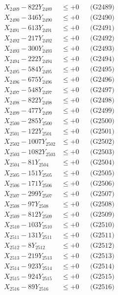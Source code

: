 \documentclass[a4paper,10pt]{article}
\begin{document}
{\begin{align}
X_{2489} - 822Y_{2489} &\leq +0 && \text{(G2489)} \\
X_{2490} - 346Y_{2490} &\leq +0 && \text{(G2490)} \\
\allowbreak
X_{2491} - 613Y_{2491} &\leq +0 && \text{(G2491)} \\
X_{2492} - 217Y_{2492} &\leq +0 && \text{(G2492)} \\
X_{2493} - 300Y_{2493} &\leq +0 && \text{(G2493)} \\
X_{2494} - 222Y_{2494} &\leq +0 && \text{(G2494)} \\
X_{2495} - 584Y_{2495} &\leq +0 && \text{(G2495)} \\
X_{2496} - 675Y_{2496} &\leq +0 && \text{(G2496)} \\
X_{2497} - 548Y_{2497} &\leq +0 && \text{(G2497)} \\
X_{2498} - 822Y_{2498} &\leq +0 && \text{(G2498)} \\
X_{2499} - 477Y_{2499} &\leq +0 && \text{(G2499)} \\
X_{2500} - 285Y_{2500} &\leq +0 && \text{(G2500)} \\
\allowbreak
X_{2501} - 122Y_{2501} &\leq +0 && \text{(G2501)} \\
X_{2502} - 1007Y_{2502} &\leq +0 && \text{(G2502)} \\
X_{2503} - 1082Y_{2503} &\leq +0 && \text{(G2503)} \\
X_{2504} - 81Y_{2504} &\leq +0 && \text{(G2504)} \\
X_{2505} - 151Y_{2505} &\leq +0 && \text{(G2505)} \\
X_{2506} - 171Y_{2506} &\leq +0 && \text{(G2506)} \\
X_{2507} - 299Y_{2507} &\leq +0 && \text{(G2507)} \\
X_{2508} - 97Y_{2508} &\leq +0 && \text{(G2508)} \\
X_{2509} - 812Y_{2509} &\leq +0 && \text{(G2509)} \\
X_{2510} - 103Y_{2510} &\leq +0 && \text{(G2510)} \\
\allowbreak
X_{2511} - 131Y_{2511} &\leq +0 && \text{(G2511)} \\
X_{2512} - 8Y_{2512} &\leq +0 && \text{(G2512)} \\
X_{2513} - 219Y_{2513} &\leq +0 && \text{(G2513)} \\
X_{2514} - 923Y_{2514} &\leq +0 && \text{(G2514)} \\
X_{2515} - 924Y_{2515} &\leq +0 && \text{(G2515)} \\
X_{2516} - 89Y_{2516} &\leq +0 && \text{(G2516)} \\

\end{align}}
\end{document}
